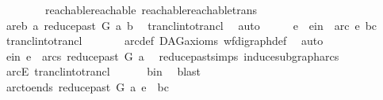\begin{isabellebody}
\ \ \ \ \ \ \ \ reachable{}{\isacharunderscore}{\kern0pt}reachable\ reachable{}{\isacharunderscore}{\kern0pt}reachable{\isacharunderscore}{\kern0pt}trans{\isacharparenright}{\kern0pt}\ \isanewline
\ \ \isamarkupfalse%
\ \isamarkupfalse%
\ a{}{\isacharunderscore}{\kern0pt}re{\isacharunderscore}{\kern0pt}b{\isacharcolon}{\kern0pt}\ {\isachardoublequoteopen}a{}\ {\isasymrightarrow}\isactrlsup {\isacharplus}{\kern0pt}\isactrlbsub reduce{\isacharunderscore}{\kern0pt}past\ G\ a\isactrlesub \ b{\isachardoublequoteclose}\ \isamarkupfalse%
\ trancl{\isacharunderscore}{\kern0pt}into{\isacharunderscore}{\kern0pt}trancl\ \isamarkupfalse%
\ auto\isanewline
\ \ \isamarkupfalse%
\ \isamarkupfalse%
\ e\ \ e{\isacharunderscore}{\kern0pt}in{\isacharcolon}{\kern0pt}\ {\isachardoublequoteopen}\ arc\ e\ {\isacharparenleft}{\kern0pt}b{\isacharcomma}{\kern0pt}c{\isacharparenright}{\kern0pt}{\isachardoublequoteclose}\ \isamarkupfalse%
\ trancl{\isacharunderscore}{\kern0pt}into{\isacharunderscore}{\kern0pt}trancl\ \isanewline
\ \ \ \ \ \ arc{\isacharunderscore}{\kern0pt}def\ DAG{\isacharunderscore}{\kern0pt}axioms\ wf{\isacharunderscore}{\kern0pt}digraph{\isacharunderscore}{\kern0pt}def\ \isamarkupfalse%
\ auto\ \isanewline
\ \ \isamarkupfalse%
\ \isamarkupfalse%
\ e{\isacharunderscore}{\kern0pt}in{}{\isacharcolon}{\kern0pt}\ {\isachardoublequoteopen}e\ {\isasymin}\ arcs\ {\isacharparenleft}{\kern0pt}reduce{\isacharunderscore}{\kern0pt}past\ G\ a{\isacharparenright}{\kern0pt}{\isachardoublequoteclose}\ \isamarkupfalse%
\ reduce{\isacharunderscore}{\kern0pt}past{\isachardot}{\kern0pt}simps\ induce{\isacharunderscore}{\kern0pt}subgraph{\isacharunderscore}{\kern0pt}arcs\isanewline
\ \ \ \ \isamarkupfalse%
\ arcE\ trancl{\isacharunderscore}{\kern0pt}into{\isacharunderscore}{\kern0pt}trancl\isanewline
\ \ \ \ \ \ b{\isacharunderscore}{\kern0pt}in\ \isamarkupfalse%
\ blast\ \isanewline
\ \ \isamarkupfalse%
\ \isamarkupfalse%
\ {\isachardoublequoteopen}arc{\isacharunderscore}{\kern0pt}to{\isacharunderscore}{\kern0pt}ends\ {\isacharparenleft}{\kern0pt}reduce{\isacharunderscore}{\kern0pt}past\ G\ a{\isacharparenright}{\kern0pt}\ e\ {\isacharequal}{\kern0pt}\ {\isacharparenleft}{\kern0pt}b{\isacharcomma}{\kern0pt}c{\isacharparenright}{\kern0pt}{\isachardoublequoteclose}\ \isamarkupfalse%

\end{isabellebody}
